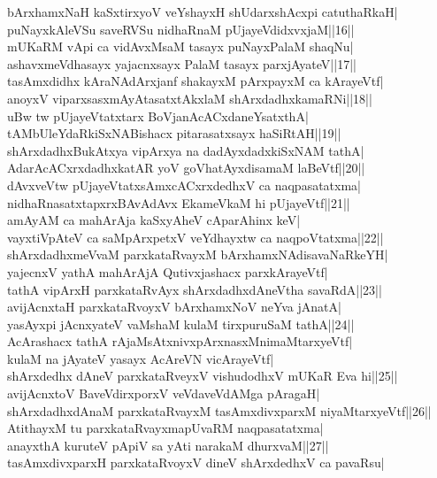 \documentclass{article}
\begin{document}
bArxhamxNaH kaSxtirxyoV veYshayxH shUdarxshAcxpi catuthaRkaH|\\
puNayxkAleVSu saveRVSu nidhaRnaM pUjayeVdidxvxjaM||16||\\
mUKaRM vApi ca vidAvxMsaM tasayx puNayxPalaM shaqNu|\\
ashavxmeVdhasayx yajacnxsayx PalaM tasayx parxjAyateV||17||\\
tasAmxdidhx kAraNAdArxjanf shakayxM pArxpayxM ca kArayeVtf|\\
anoyxV viparxsasxmAyAtasatxtAkxlaM shArxdadhxkamaRNi||18||\\
uBw tw pUjayeVtatxtarx BoVjanAcACxdaneYsatxthA|\\
tAMbUleYdaRkiSxNABishacx pitarasatxsayx haSiRtAH||19||\\
shArxdadhxBukAtxya vipArxya na dadAyxdadxkiSxNAM tathA|\\
AdarAcACxrxdadhxkatAR yoV goVhatAyxdisamaM laBeVtf||20||\\
dAvxveVtw pUjayeVtatxsAmxcACxrxdedhxV ca naqpasatatxma|\\
nidhaRnasatxtapxrxBAvAdAvx EkameVkaM hi pUjayeVtf||21||\\
amAyAM ca mahArAja kaSxyAheV cAparAhinx keV|\\
vayxtiVpAteV ca saMpArxpetxV veYdhayxtw ca naqpoVtatxma||22||\\
shArxdadhxmeVvaM parxkataRvayxM bArxhamxNAdisavaNaRkeYH|\\
yajecnxV yathA mahArAjA Qutivxjashacx parxkArayeVtf|\\
tathA vipArxH parxkataRvAyx shArxdadhxdAneVtha savaRdA||23||\\
avijAcnxtaH parxkataRvoyxV bArxhamxNoV neYva jAnatA|\\
yasAyxpi jAcnxyateV vaMshaM kulaM tirxpuruSaM tathA||24||\\
AcArashacx tathA rAjaMsAtxnivxpArxnasxMnimaMtarxyeVtf|\\
kulaM na jAyateV yasayx AcAreVN vicArayeVtf|\\
shArxdedhx dAneV parxkataRveyxV vishudodhxV mUKaR Eva hi||25||\\
avijAcnxtoV BaveVdirxporxV veVdaveVdAMga pAragaH|\\
shArxdadhxdAnaM parxkataRvayxM tasAmxdivxparxM niyaMtarxyeVtf||26||\\
AtithayxM tu parxkataRvayxmapUvaRM naqpasatatxma|\\
anayxthA kuruteV pApiV sa yAti narakaM dhurxvaM||27||\\
tasAmxdivxparxH parxkataRvoyxV dineV shArxdedhxV ca pavaRsu|\\
\end{document}
